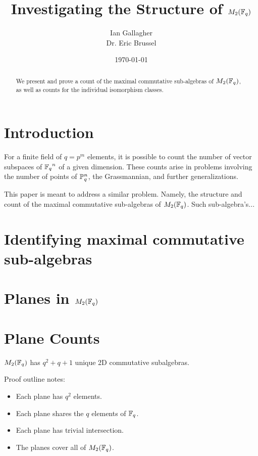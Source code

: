 \documentclass{amsart}
\title{Investigating the Structure of $M_2(\protect\mathbb{F}_q)$}
\author{Ian Gallagher \\ Dr. Eric Brussel}
\date{\today}
\begin{document}
\maketitle

\begin{abstract}
    We present and prove a count of the maximal commutative sub-algebras of
    $M_2(\protect\mathbb{F}_q)$, as well as counts for the individual isomorphism classes. 
\end{abstract}

\section{Introduction}
For a finite field of $q = p^m$ elements, it is possible to count the number of
vector subspaces of ${\protect\mathbb{F}_q}^n$ of a given dimension. These counts arise in
problems involving the number of points of $\protect\mathbb{P}^n_q$, the Grassmannian,
and further generalizations. %

This paper is meant to address a similar problem. Namely, the structure and 
count of the maximal commutative sub-algebras of $M_2(\protect\mathbb{F}_q)$. Such
sub-algebra's...

\section{Identifying maximal commutative sub-algebras}


\section{Planes in $M_2(\protect\mathbb{F}_q)$}


\section{Plane Counts}

\begin{theorem}
    $M_2(\protect\mathbb{F}_q)$ has $q^2 + q + 1$ unique 2D commutative subalgebras.
\end{theorem}

Proof outline notes:
\begin{itemize}
    \item Each plane has $q^2$ elements.
    \item Each plane shares the $q$ elements of $\protect\mathbb{F}_q$.
    \item Each plane has trivial intersection.
    \item The planes cover all of $M_2(\protect\mathbb{F}_q)$.
\end{itemize}
\end{document}
